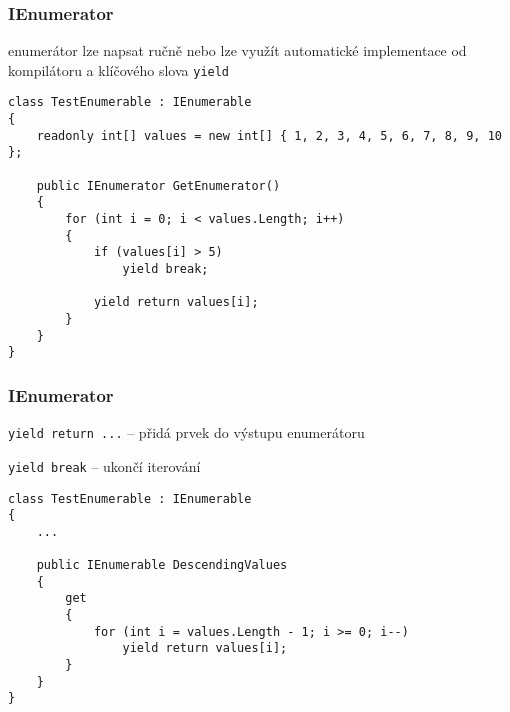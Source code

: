 \begin{frame}[fragile]
\frametitle{IEnumerator}
\vfill
\begin{bitemize}{}
\item enumerátor lze napsat ručně nebo lze využít automatické implementace od kompilátoru a klíčového slova \lstinline|yield|
\end{bitemize}
\vfill
\begin{yesblock}
\begin{lstlisting}
class TestEnumerable : IEnumerable
{
    readonly int[] values = new int[] { 1, 2, 3, 4, 5, 6, 7, 8, 9, 10 };

    public IEnumerator GetEnumerator()
    {
        for (int i = 0; i < values.Length; i++)
        {
            if (values[i] > 5)
                yield break;

            yield return values[i];
        }
    }
}
\end{lstlisting}
\end{yesblock}
\vfill
\end{frame}


\begin{frame}[fragile]
\frametitle{IEnumerator}
\vfill
\begin{bitemize}{}
\item \lstinline|yield return ...| -- přidá prvek do výstupu enumerátoru
\item \lstinline|yield break| -- ukončí iterování
\end{bitemize}
\vfill
\begin{yesblock}
\begin{lstlisting}
class TestEnumerable : IEnumerable
{
    ...
    
    public IEnumerable DescendingValues
    {
        get
        {
            for (int i = values.Length - 1; i >= 0; i--)
                yield return values[i];
        }
    }
}
\end{lstlisting}
\end{yesblock}
\vfill
\end{frame}
